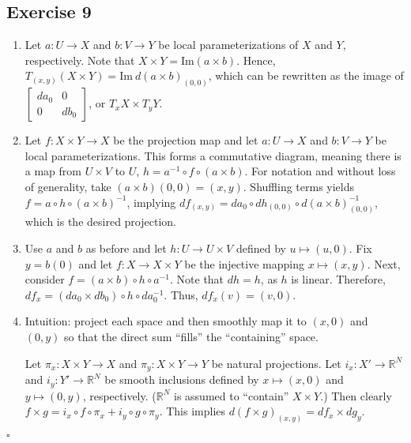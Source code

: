 \documentclass{article}
\begin{document}
\subsection*{Exercise 9}
\begin{enumerate}[label=(\arabic*)]
\item{
	Let $a\colon U\to X$ and $b\colon V\to Y$ be local parameterizations
	of $X$ and $Y$, respectively.
	Note that $X\times Y = \text{Im}(a\times b)$.
	Hence, $T_{(x,y)}(X\times Y) =
		\text{Im}\ d(a\times b)_{(0,0)}$,
	which can be rewritten as the image of
	$\left[
		\begin{smallmatrix}
			da_0  & 0   \\
			0     & db_0
		\end{smallmatrix}
	\right]$,
	or $T_xX\times T_yY$.
}
\item{
	Let $f\colon X\times Y\to X$ be the projection map and let
	$a\colon U\to X$ and $b\colon V\to Y$ be local parameterizations.
	This forms a commutative diagram, meaning there is a map from
	$U\times V$ to $U$, $h=a^{-1}\circ f\circ (a\times b)$.
	For notation and without loss of generality, take
	$(a\times b)(0,0)=(x,y)$.
	Shuffling terms yields
	$f=a\circ h \circ (a\times b)^{-1}$, implying
	$df_{(x,y)}=da_0 \circ dh_{(0,0)}
		\circ d(a\times b)^{-1}_{(0,0)}$,
	which is the desired projection.
}
\item{
	Use $a$ and $b$ as before and let $h\colon U\to U\times V$
	defined by $u\mapsto(u,0)$. Fix $y=b(0)$ and let
	$f\colon X\to X\times Y$ be the injective mapping
	$x\mapsto(x,y)$.
	Next, consider $f=(a\times b)\circ h\circ a^{-1}$.
	Note that $dh=h$, as $h$ is linear.
	Therefore, $df_x=(da_0\times db_0)\circ h\circ da^{-1}_0$.
	Thus, $df_x(v)=(v,0)$.
}
\item{
	Intuition: project each space and then smoothly map it
	to $(x,0)$ and $(0,y)$ so that the direct sum ``fills'' the
	``containing'' space.

	Let $\pi_x\colon X\times Y\to X$ and
	$\pi_y\colon X\times Y\to Y$ be natural projections.
	Let $i_x\colon X'\to\mathbb{R}^N$ and
	$i_y\colon Y'\to\mathbb{R}^N$ be smooth inclusions
	defined by $x\mapsto(x,0)$ and $y\mapsto(0,y)$, respectively.
	($\mathbb{R}^N$ is assumed to ``contain'' $X\times Y$.)
	Then clearly $f\times g=i_x\circ f\circ \pi_x +
		i_y\circ g\circ\pi_y$.
	This implies $d(f\times g)_{(x,y)}=df_x\times dg_y$.
}
\end{enumerate}
\hfill $\square$
\end{document}
